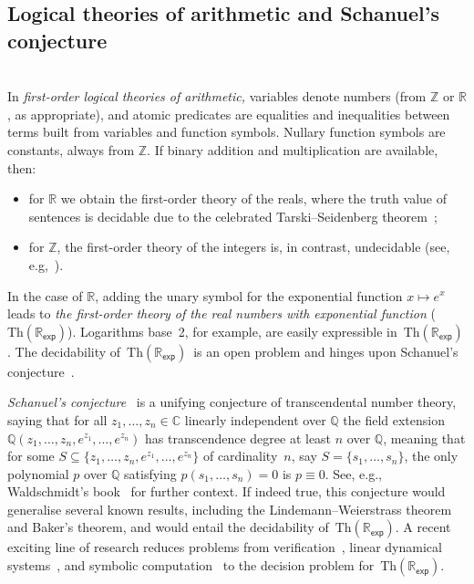 \documentclass[10pt,a4paper]{amsart}
\numberwithin{equation}{section}
\theoremstyle{plain}
\theoremstyle{definition}
\theoremstyle{remark}
\newcommand{\rexp}{$\mathrm{Th}(\mathbb R_{\mathsf{exp}})$}
\begin{document}
\subsection{Logical theories of arithmetic and Schanuel's conjecture}
\label{sec:logicaltheoriesschan}\mbox{}\\In \emph{first-order logical theories of arithmetic,}
variables denote numbers (from $\mathbb Z$ or $\mathbb R$, as appropriate),
and atomic predicates are equalities and inequalities between terms
built from variables and function symbols.
Nullary function symbols are constants, always from $\mathbb Z$.
If binary addition and multiplication are available, then:
\begin{itemize}
\item for $\mathbb R$
we obtain the first-order theory of the reals, where the truth value of
sentences is decidable due to the celebrated Tarski--Seidenberg theorem~\cite[Chapter~11 and Theorem~2.77]{BPR};
\item for $\mathbb Z$,
the first-order theory of the integers is, in contrast, undecidable
(see, e.g,~\cite{poonen2003hilbert}).
\end{itemize}
In the case of $\mathbb R$, adding the unary symbol for the exponential function
$x \mapsto e^x$ leads to
\emph{the first-order theory of the real numbers with exponential
function} (\rexp).
Logarithms base~2, for example, are easily expressible in~\rexp.
The decidability of~\rexp\ is an open problem
and hinges upon Schanuel's conjecture~\cite{macintyre1996decidability}.

\emph{Schanuel's conjecture}~\cite{lang1966introduction} is a unifying conjecture of
transcendental number theory, saying that for all $z_1,\dots,z_n \in \mathbb C$ linearly
independent over $\mathbb{Q}$ the field extension
$\mathbb{Q}(z_1,\dots,z_n,e^{z_1},\dots,e^{z_n})$ has  transcendence degree at
least $n$ over $\mathbb{Q}$,
meaning that for some $S \subseteq \{z_1, \dots, z_n,e^{z_1}, \dots, e^{z_n}\}$
of cardinality~$n$, say $S = \{s_1, \ldots, s_n\}$,
the only polynomial $p$ over $\mathbb Q$ satisfying
$p(s_1, \ldots, s_n) = 0$ is $p \equiv 0$. See, e.g., Waldschmidt's book~\cite[Section~1.4]{Waldschmidt00} for
  further context.
If indeed true, this conjecture would
generalise several known results, including the Lindemann--Weierstrass theorem
and Baker's theorem,
and would entail the decidability of~\rexp.
A recent exciting line of research
reduces problems from verification~\cite{DAVIAUD202178,Majumdar20}, linear dynamical systems~\cite{AlmagorCO018,ChonevOW16},
and symbolic computation~\cite{Huang18} to the decision problem for~\rexp.
\end{document}
